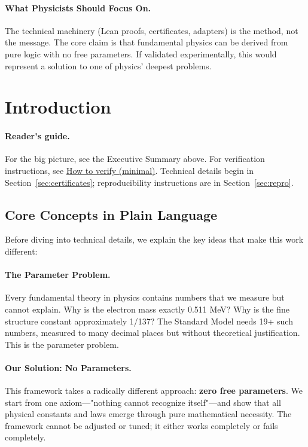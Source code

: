 \documentclass[11pt,a4paper,twoside]{article}
\numberwithin{equation}{section}
\theoremstyle{customthm}
\theoremstyle{customdef}
\theoremstyle{customrem}
\begin{document}
\paragraph{What Physicists Should Focus On.} The technical machinery (Lean proofs, certificates, adapters) is the method, not the message. The core claim is that fundamental physics can be derived from pure logic with no free parameters. If validated experimentally, this would represent a solution to one of physics' deepest problems.

\newpage
\tableofcontents
\newpage

\section{Introduction}
\paragraph{Reader's guide.} For the big picture, see the Executive Summary above. For verification instructions, see \hyperlink{verify-minimal}{How to verify (minimal)}. Technical details begin in Section~\ref{sec:certificates}; reproducibility instructions are in Section~\ref{sec:repro}.

\subsection{Core Concepts in Plain Language}

Before diving into technical details, we explain the key ideas that make this work different:

\paragraph{The Parameter Problem.} Every fundamental theory in physics contains numbers that we measure but cannot explain. Why is the electron mass exactly 0.511 MeV? Why is the fine structure constant approximately 1/137? The Standard Model needs 19+ such numbers, measured to many decimal places but without theoretical justification. This is the parameter problem.

\paragraph{Our Solution: No Parameters.} This framework takes a radically different approach: \textbf{zero free parameters}. We start from one axiom—"nothing cannot recognize itself"—and show that all physical constants and laws emerge through pure mathematical necessity. The framework cannot be adjusted or tuned; it either works completely or fails completely.
\end{document}
